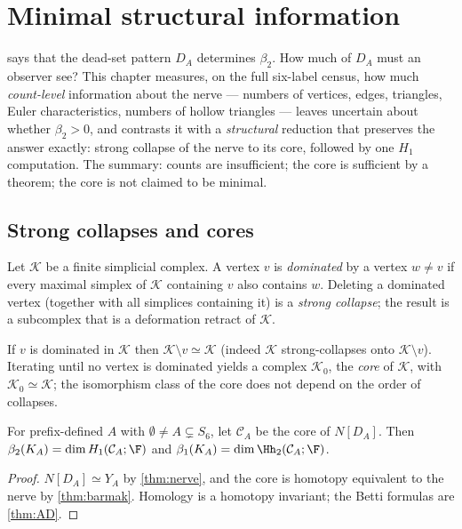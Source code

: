 \chapter{Minimal structural information}\label{ch:minimal}

 says that the dead-set pattern $D_A$ determines $\beta_2$. How much of $D_A$ must an observer see? This chapter measures, on the full six-label census, how much \emph{count-level} information about the nerve --- numbers of vertices, edges, triangles, Euler characteristics, numbers of hollow triangles --- leaves uncertain about whether $\beta_2>0$, and contrasts it with a \emph{structural} reduction that preserves the answer exactly: strong collapse of the nerve to its core, followed by one $H_1$ computation. The summary: counts are insufficient; the core is sufficient by a theorem; the core is not claimed to be minimal.

\section{Strong collapses and cores}
Let $\mathcal K$ be a finite simplicial complex. A vertex $v$ is \emph{dominated} by a vertex $w\neq v$ if every maximal simplex of $\mathcal K$ containing $v$ also contains $w$. Deleting a dominated vertex (together with all simplices containing it) is a \emph{strong collapse}; the result is a subcomplex that is a deformation retract of $\mathcal K$.
\begin{theorem}\label{thm:barmak}
If $v$ is dominated in $\mathcal K$ then $\mathcal K\setminus v\simeq\mathcal K$ (indeed $\mathcal K$ strong-collapses onto $\mathcal K\setminus v$). Iterating until no vertex is dominated yields a complex $\mathcal K_0$, the \emph{core} of $\mathcal K$, with $\mathcal K_0\simeq\mathcal K$; the isomorphism class of the core does not depend on the order of collapses.
\end{theorem}
\begin{corollary}\label{cor:core-suffices}
For prefix-defined $A$ with $\emptyset\ne A\subsetneq S_6$, let $\mathcal C_A$ be the core of $N[D_A]$. Then $\beta_2(K_A)=\dim H_1(\mathcal C_A;\F)$ and $\beta_1(K_A)=\dim\Hh_2(\mathcal C_A;\F)$.
\end{corollary}
\begin{proof}
$N[D_A]\simeq Y_A$ by \cref{thm:nerve}, and the core is homotopy equivalent to the nerve by \cref{thm:barmak}. Homology is a homotopy invariant; the Betti formulas are \cref{thm:AD}.
\end{proof}

